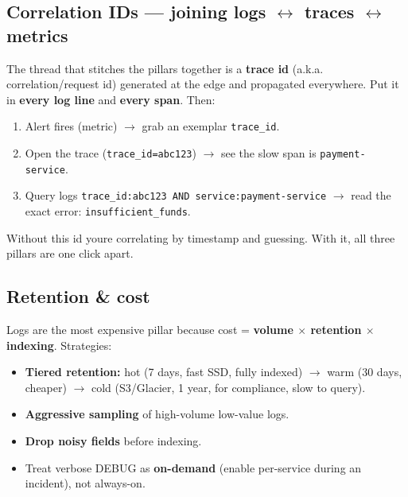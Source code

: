 \documentclass[11pt]{article}
\providecommand{\tightlist}{\setlength{\itemsep}{1pt}\setlength{\parskip}{0pt}}
\begin{document}
\subsection{\texorpdfstring{Correlation IDs --- joining logs \(\leftrightarrow\) traces \(\leftrightarrow\) metrics}{Correlation IDs --- joining logs \textbackslash leftrightarrow traces \textbackslash leftrightarrow metrics}}\label{correlation-ids--joining-logs-leftrightarrow-traces-leftrightarrow-metrics}

The thread that stitches the pillars together is a \textbf{trace id} (a.k.a. correlation/request id) generated at the edge and propagated everywhere. Put it in \textbf{every log line} and \textbf{every span}. Then:

\begin{enumerate}
\def\labelenumi{\arabic{enumi}.}
\tightlist
\item
  Alert fires (metric) \(\rightarrow\) grab an exemplar \texttt{trace\_id}.
\item
  Open the trace (\texttt{trace\_id=abc123}) \(\rightarrow\) see the slow span is \texttt{payment-service}.
\item
  Query logs \texttt{trace\_id:abc123\ AND\ service:payment-service} \(\rightarrow\) read the exact error: \texttt{insufficient\_funds}.
\end{enumerate}

Without this id you\textquotesingle re correlating by timestamp and guessing. With it, all three pillars are one click apart.

\subsection{Retention \& cost}\label{retention--cost}

Logs are the most expensive pillar because cost = \textbf{volume \(\times\) retention \(\times\) indexing}. Strategies:

\begin{itemize}
\tightlist
\item
  \textbf{Tiered retention:} hot (7 days, fast SSD, fully indexed) \(\rightarrow\) warm (30 days, cheaper) \(\rightarrow\) cold (S3/Glacier, 1 year, for compliance, slow to query).
\item
  \textbf{Aggressive sampling} of high-volume low-value logs.
\item
  \textbf{Drop noisy fields} before indexing.
\item
  Treat verbose DEBUG as \textbf{on-demand} (enable per-service during an incident), not always-on.
\end{itemize}
\end{document}
